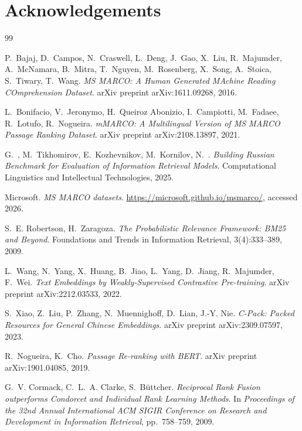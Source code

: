 \documentclass[runningheads,a4paper]{llncs}
\begin{document}
\section*{Acknowledgements}



\begin{thebibliography}{99}

P.~Bajaj, D.~Campos, N.~Craswell, L.~Deng, J.~Gao, X.~Liu, R.~Majumder, A.~McNamara, B.~Mitra, T.~Nguyen, M.~Rosenberg, X.~Song, A.~Stoica, S.~Tiwary, T.~Wang.
\newblock \textit{MS MARCO: A Human Generated MAchine Reading COmprehension Dataset}.
\newblock arXiv preprint arXiv:1611.09268, 2016.

L.~Bonifacio, V.~Jeronymo, H.~Queiroz Abonizio, I.~Campiotti, M.~Fadaee, R.~Lotufo, R.~Nogueira.
\newblock \textit{mMARCO: A Multilingual Version of MS MARCO Passage Ranking Dataset}.
\newblock arXiv preprint arXiv:2108.13897, 2021.

G.~, M.~Tikhomirov, E.~Kozhevnikov, M.~Kornilov, N.~.
\newblock \textit{Building Russian Benchmark for Evaluation of Information Retrieval Models}.
\newblock Computational Linguistics and Intellectual Technologies, 2025.



Microsoft.
\newblock \textit{MS MARCO datasets}.
\newblock \url{https://microsoft.github.io/msmarco/}, accessed 2026.

S.~E. Robertson, H.~Zaragoza.
\newblock \textit{The Probabilistic Relevance Framework: BM25 and Beyond}.
\newblock Foundations and Trends in Information Retrieval, 3(4):333--389, 2009.

L.~Wang, N.~Yang, X.~Huang, B.~Jiao, L.~Yang, D.~Jiang, R.~Majumder, F.~Wei.
\newblock \textit{Text Embeddings by Weakly-Supervised Contrastive Pre-training}.
\newblock arXiv preprint arXiv:2212.03533, 2022.

S.~Xiao, Z.~Liu, P.~Zhang, N.~Muennighoff, D.~Lian, J.-Y. Nie.
\newblock \textit{C-Pack: Packed Resources for General Chinese Embeddings}.
\newblock arXiv preprint arXiv:2309.07597, 2023.

R.~Nogueira, K.~Cho.
\newblock \textit{Passage Re-ranking with BERT}.
\newblock arXiv preprint arXiv:1901.04085, 2019.

G.~V. Cormack, C.~L.~A. Clarke, S.~B{\"u}ttcher.
\newblock \textit{Reciprocal Rank Fusion outperforms Condorcet and Individual Rank Learning Methods}.
\newblock In \textit{Proceedings of the 32nd Annual International ACM SIGIR Conference on Research and Development in Information Retrieval}, pp.~758--759, 2009.


\end{thebibliography}
\end{document}

